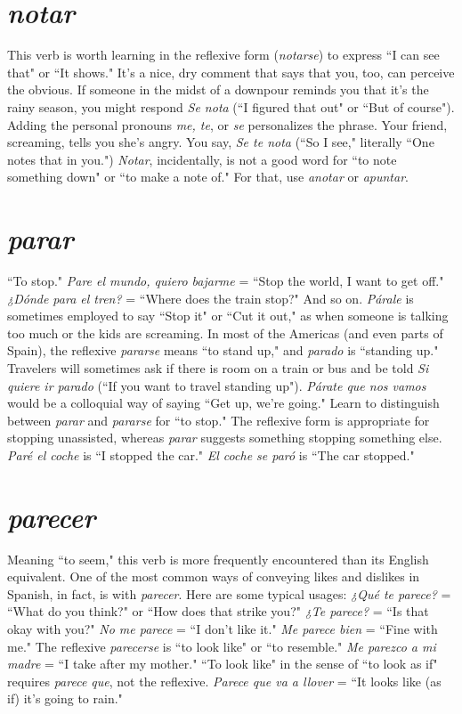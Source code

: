 \section{\emph{notar}}

This verb is worth learning in the reflexive form (\emph{notarse}) to
express ``I can see that" or ``It shows." It's a nice, dry comment that
says that you, too, can perceive the obvious. If someone in the midst of
a downpour reminds you that it's the rainy season, you might respond
\emph{Se nota} (``I figured that out" or ``But of course"). Adding the personal
pronouns \emph{me, te}, or \emph{se} personalizes the phrase. Your friend, screaming,
tells you she's angry. You say, \emph{Se te nota} (``So I see," literally ``One
notes that in you.") \emph{Notar}, incidentally, is not a good word for ``to
note something down" or ``to make a note of." For that, use \emph{anotar}
or \emph{apuntar}.

\section{\emph{parar}}

``To stop." \emph{Pare el mundo, quiero bajarme} = ``Stop the world,
I want to get off." \emph{¿Dónde para el tren?} = ``Where does the train stop?"
And so on. \emph{Párale} is sometimes employed to say ``Stop it" or ``Cut it
out," as when someone is talking too much or the kids are screaming.
In most of the Americas (and even parts of Spain), the reflexive \emph{pararse}
means ``to stand up," and \emph{parado} is ``standing up." Travelers will
sometimes ask if there is room on a train or bus and be told \emph{Si quiere
ir parado} (``If you want to travel standing up"). \emph{Párate que nos vamos}
would be a colloquial way of saying ``Get up, we're going." Learn to
distinguish between \emph{parar} and \emph{pararse} for ``to stop." The reflexive
form is appropriate for stopping unassisted, whereas \emph{parar} suggests
something stopping something else. \emph{Paré el coche} is ``I stopped the
car." \emph{El coche se paró} is ``The car stopped."

\section{\emph{parecer}}

Meaning ``to seem," this verb is more frequently encountered
than its English equivalent. One of the most common ways of conveying likes and dislikes in Spanish, in fact, is with \emph{parecer}. Here are
some typical usages: \emph{¿Qué te parece?} = ``What do you think?" or
``How does that strike you?" \emph{¿Te parece?} = ``Is that okay with you?"
\emph{No me parece} = ``I don't like it." \emph{Me parece bien} = ``Fine with me."
The reflexive \emph{parecerse} is ``to look like" or ``to resemble." \emph{Me parezco a mi madre}
 = ``I take after my mother." ``To look like" in the sense of
 ``to look as if" requires \emph{parece que}, not the reflexive. \emph{Parece que va a
llover} = ``It looks like (as if) it's going to rain."

